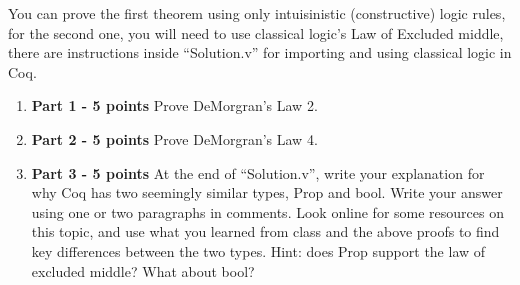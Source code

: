 \documentclass{article}
\begin{document}
You can prove the first theorem using only intuisinistic (constructive) logic rules, for the second one, you will need to use classical logic's Law of Excluded middle, there are
instructions inside ``Solution.v'' for importing and using classical logic in Coq.

\begin{enumerate}
    \item \textbf{Part 1 - 5 points} Prove DeMorgran's Law 2.
    \item \textbf{Part 2 - 5 points} Prove DeMorgran's Law 4.
    \item \textbf{Part 3 - 5 points} At the end of ``Solution.v'', write your explanation for why Coq has two seemingly similar types, Prop and bool. Write your answer using one or two paragraphs in comments.
    Look online for some resources on this topic, and use what you learned from class and the above proofs to find key differences between the two types. Hint: does Prop support the law of excluded middle? What about bool?
\end{enumerate}
\end{document}
